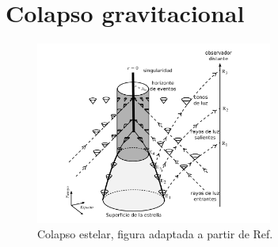 \section{Colapso gravitacional}

%

\begin{figure}[H]
\begin{center}
\includegraphics[height=6cm]{fig/fig-colapso.pdf}
\caption{Colapso estelar, figura adaptada a partir de Ref. \cite{Luminet98}}
\label{fig:colapso}
\end{center}
\end{figure}
